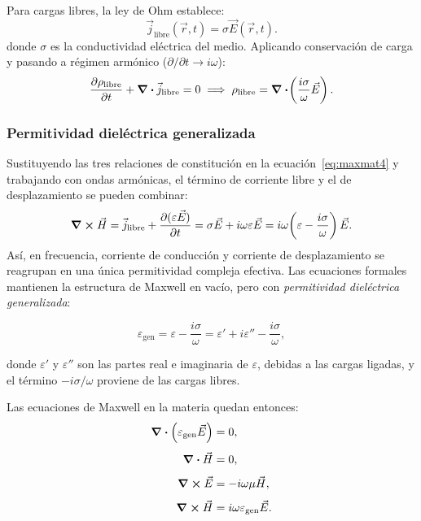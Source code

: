 \documentclass[12pt, a4paper]{article}
\theoremstyle{plain}
\theoremstyle{definition}
\theoremstyle{remark}
\newcommand{\ve}[1]{\vec{#1}}
\begin{document}
Para cargas libres, la ley de Ohm establece:
\begin{equation}
  \ve{j}_\text{libre}(\ve{r},t) = \sigma\ve{E}(\ve{r},t). \label{eq:ohm}
\end{equation}
donde $\sigma$ es la conductividad eléctrica del medio.
Aplicando conservación de carga y pasando a régimen armónico
($\partial/\partial t\to i\omega$):
\[
  \pdv{\rho_\text{libre}}{t} + \div\ve{j}_\text{libre} = 0
  \implies \rho_\text{libre} = \div\!\left(\frac{i\sigma}{\omega}\ve{E}\right).
\]

\subsubsection{Permitividad dieléctrica generalizada}

Sustituyendo las tres relaciones de constitución en la
ecuación~\eqref{eq:maxmat4} y trabajando con ondas armónicas, el término
de corriente libre y el de desplazamiento se pueden combinar:
\[
  \curl\ve{H} = \ve{j}_\text{libre} + \pdv{(\varepsilon\ve{E})}{t}
  = \sigma\ve{E} + i\omega\varepsilon\ve{E}
  = i\omega\!\left(\varepsilon - \frac{i\sigma}{\omega}\right)\ve{E}.
\]
Así, en frecuencia, corriente de conducción y corriente de desplazamiento se
reagrupan en una única permitividad compleja efectiva. Las ecuaciones formales
mantienen la estructura de Maxwell en vacío, pero con \emph{permitividad
dieléctrica generalizada}:

\begin{mdframed}[style=resultado]
\begin{equation}
  \varepsilon_\text{gen} = \varepsilon - \frac{i\sigma}{\omega}
  = \varepsilon' + i\varepsilon'' - \frac{i\sigma}{\omega},
  \label{eq:epsilongen}
\end{equation}
\end{mdframed}

donde $\varepsilon'$ y $\varepsilon''$ son las partes real e imaginaria de
$\varepsilon$, debidas a las cargas ligadas, y el término $-i\sigma/\omega$
proviene de las cargas libres.

Las ecuaciones de Maxwell en la materia quedan entonces:
\begin{align}
  \div(\varepsilon_\text{gen}\ve{E}) &= 0, \label{eq:mat1}\\[4pt]
  \div\ve{H} &= 0, \label{eq:mat2}\\[4pt]
  \curl\ve{E} &= -i\omega\mu\ve{H}, \label{eq:mat3}\\[4pt]
  \curl\ve{H} &= i\omega\varepsilon_\text{gen}\ve{E}. \label{eq:mat4}
\end{align}
\end{document}
